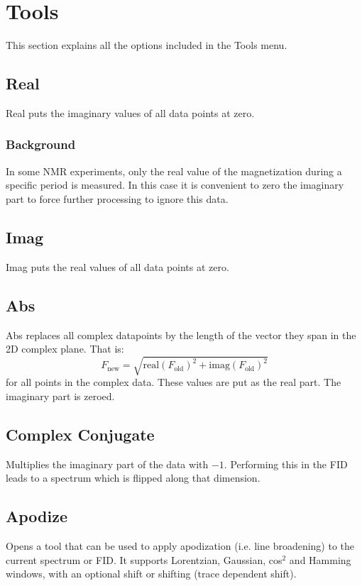 \documentclass[11pt,a4paper]{article}
\begin{document}
\section{Tools}
This section explains all the options included in the Tools menu. 

\subsection{Real}
Real puts the imaginary values of all data points at zero.

\subsubsection*{Background}
In some NMR experiments, only the real value of the magnetization during a specific period is measured. In this case it is convenient to zero the imaginary part to force further processing to ignore this data.


\subsection{Imag}
Imag puts the real values of all data points at zero.

\subsection{Abs}
Abs replaces all complex datapoints by the length of the vector they span in the 2D complex plane. That is:
\begin{equation*}
F_\text{new} = \sqrt{\text{real}(F_\text{old})^2 + \text{imag}(F_\text{old})^2}
\end{equation*}
for all points in the complex data. These values are put as the real part. The imaginary part is zeroed.



\subsection{Complex Conjugate}
Multiplies the imaginary part of the data with $-1$. Performing this in the FID leads to a spectrum which is flipped along that dimension.




\subsection{Apodize}
Opens a tool that can be used to apply apodization (i.e. line broadening) to the current spectrum or FID. It
supports Lorentzian, Gaussian, cos$^2$ and Hamming windows, with an optional shift or shifting (trace
dependent shift). 
\end{document}
